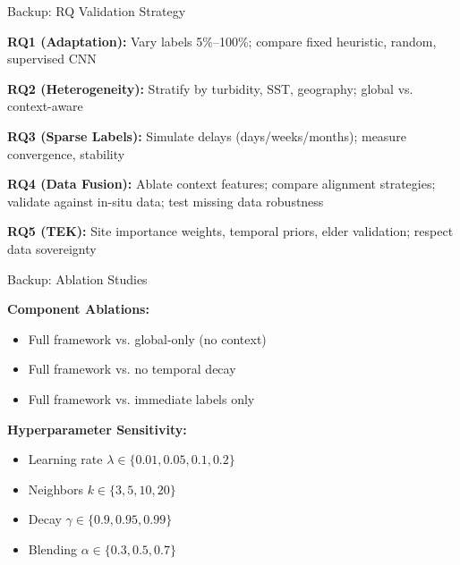 \documentclass[10pt,xcolor={table,dvipsnames}]{beamer}
\begin{document}
\begin{frame}{Backup: RQ Validation Strategy}

\textbf{RQ1 (Adaptation):} Vary labels 5\%--100\%; compare fixed heuristic, random, supervised CNN

\vspace{0.25em}
\textbf{RQ2 (Heterogeneity):} Stratify by turbidity, SST, geography; global vs. context-aware

\vspace{0.25em}
\textbf{RQ3 (Sparse Labels):} Simulate delays (days/weeks/months); measure convergence, stability

\vspace{0.25em}
\textbf{RQ4 (Data Fusion):} Ablate context features; compare alignment strategies; validate against in-situ data; test missing data robustness

\vspace{0.25em}
\textbf{RQ5 (TEK):} Site importance weights, temporal priors, elder validation; respect data sovereignty

\end{frame}

\begin{frame}{Backup: Ablation Studies}

\textbf{Component Ablations:}
\begin{itemize}
  \item Full framework vs. global-only (no context)
  \item Full framework vs. no temporal decay
  \item Full framework vs. immediate labels only
\end{itemize}

\vspace{0.5em}
\textbf{Hyperparameter Sensitivity:}
\begin{itemize}
  \item Learning rate $\lambda \in \{0.01, 0.05, 0.1, 0.2\}$
  \item Neighbors $k \in \{3, 5, 10, 20\}$
  \item Decay $\gamma \in \{0.9, 0.95, 0.99\}$
  \item Blending $\alpha \in \{0.3, 0.5, 0.7\}$
\end{itemize}

\end{frame}
\end{document}
